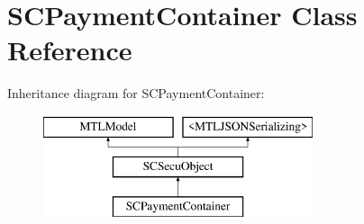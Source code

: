 \hypertarget{interface_s_c_payment_container}{}\section{S\+C\+Payment\+Container Class Reference}
\label{interface_s_c_payment_container}
Inheritance diagram for S\+C\+Payment\+Container\+:\begin{figure}[H]
\begin{center}
\leavevmode
\includegraphics[height=3.000000cm]{interface_s_c_payment_container}
\end{center}
\end{figure}
